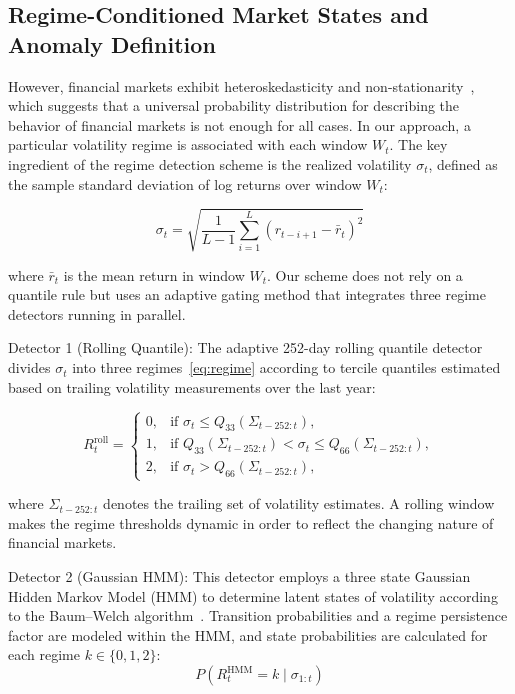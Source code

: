 \documentclass[]{interact}
\begin{document}
\subsection{Regime-Conditioned Market States and Anomaly Definition}
\label{sec:regime_definition}
However, financial markets exhibit heteroskedasticity and non-stationarity~\citep{bouchaud2001more, hamilton1989a},
which suggests that a universal probability distribution for describing the behavior of
financial markets is not enough for all cases. In our approach, a particular volatility
regime is associated with each window $W_t$. The key ingredient of the regime detection
scheme is the realized volatility $\sigma_t$, defined as the sample standard deviation of log
returns over window $W_t$:

\begin{equation}
\sigma_t =
\sqrt{
\frac{1}{L - 1}
\sum_{i=1}^{L}
(r_{t-i+1} - \bar{r}_t)^2
}
\label{eq:volatility}
\end{equation}

where $\bar{r}_t$ is the mean return in window $W_t$. Our scheme does not rely on a quantile
rule but uses an adaptive gating method that integrates three regime detectors running
in parallel.

Detector 1 (Rolling Quantile): The adaptive 252-day rolling
quantile detector divides $\sigma_t$ into three regimes~\eqref{eq:regime} according to
tercile quantiles estimated based on trailing volatility measurements over the last year:

\begin{equation}
R_t^{\text{roll}} =
\begin{cases}
0, & \text{if } \sigma_t \le Q_{33}(\Sigma_{t-252:t}), \\
1, & \text{if } Q_{33}(\Sigma_{t-252:t}) < \sigma_t \le Q_{66}(\Sigma_{t-252:t}), \\
2, & \text{if } \sigma_t > Q_{66}(\Sigma_{t-252:t}),
\end{cases}
\label{eq:regime}
\end{equation}

where $\Sigma_{t-252:t}$ denotes the trailing set of volatility estimates.
A rolling window makes the regime thresholds dynamic in
order to reflect the changing nature of financial markets.

Detector 2 (Gaussian HMM): This detector employs a three
state Gaussian Hidden Markov Model (HMM) to determine
latent states of volatility according to the Baum--Welch algorithm~\citep{hamilton1989a}. Transition probabilities and a regime persistence
factor are modeled within the HMM, and state probabilities
are calculated for each regime $k \in \{0,1,2\}$:
\begin{equation}
P(R_t^{\text{HMM}} = k \mid \sigma_{1:t})
\label{eq:hmm_prob}
\end{equation}
\end{document}

